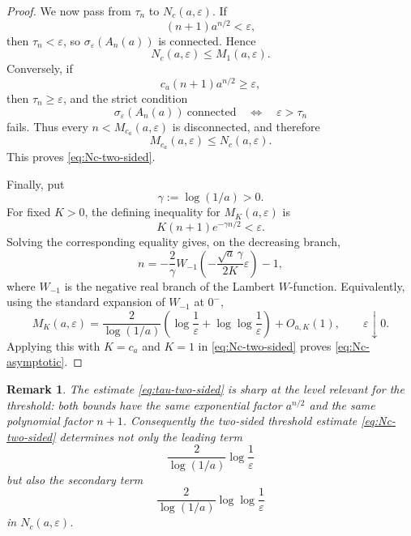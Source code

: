 \documentclass[11pt]{amsart}
\numberwithin{equation}{section}
\newcommand{\eps}{\varepsilon}
\newtheorem{remark}[theorem]{Remark}
\begin{document}
\begin{proof}
We now pass from \(\tau_n\) to \(N_c(a,\eps)\).  If
\[
(n+1)a^{n/2}<\eps,
\]
then \(\tau_n<\eps\), so \(\sigma_\eps(A_n(a))\) is connected.  Hence
\[
N_c(a,\eps)\le M_1(a,\eps).
\]
Conversely, if
\[
c_a(n+1)a^{n/2}\ge\eps,
\]
then \(\tau_n\ge\eps\), and the strict condition
\[
\sigma_\eps(A_n(a))\ \text{connected}
\quad\Longleftrightarrow\quad
\eps>\tau_n
\]
fails.  Thus every \(n<M_{c_a}(a,\eps)\) is disconnected, and therefore
\[
M_{c_a}(a,\eps)\le N_c(a,\eps).
\]
This proves \eqref{eq:Nc-two-sided}.

Finally, put
\[
\gamma:=\log(1/a)>0.
\]
For fixed \(K>0\), the defining inequality for \(M_K(a,\eps)\) is
\[
K(n+1)e^{-\gamma n/2}<\eps.
\]
Solving the corresponding equality gives, on the decreasing branch,
\[
n
=
-\frac{2}{\gamma}
W_{-1}\!\left(
-\frac{\sqrt a\,\gamma}{2K}\eps
\right)
-1,
\]
where \(W_{-1}\) is the negative real branch of the Lambert \(W\)-function.  Equivalently, using the standard expansion of \(W_{-1}\) at \(0^{-}\),
\[
M_K(a,\eps)
=
\frac{2}{\log(1/a)}
\left(
\log\frac1\eps+\log\log\frac1\eps
\right)
+
O_{a,K}(1),
\qquad \eps\downarrow0.
\]
Applying this with \(K=c_a\) and \(K=1\) in \eqref{eq:Nc-two-sided} proves
\eqref{eq:Nc-asymptotic}.
\end{proof}

\begin{remark}
The estimate \eqref{eq:tau-two-sided} is sharp at the level relevant for the threshold:
both bounds have the same exponential factor \(a^{n/2}\) and the same polynomial factor
\(n+1\).  Consequently the two-sided threshold estimate \eqref{eq:Nc-two-sided}
determines not only the leading term
\[
\frac{2}{\log(1/a)}\log\frac1\eps
\]
but also the secondary term
\[
\frac{2}{\log(1/a)}\log\log\frac1\eps
\]
in \(N_c(a,\eps)\).
\end{remark}
\end{document}

